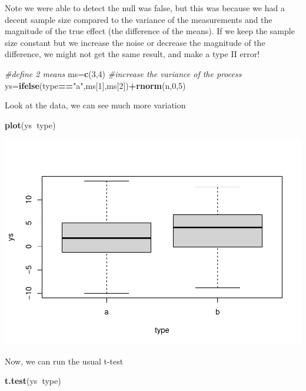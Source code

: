 \documentclass[
]{book}
\newenvironment{Shaded}{\begin{snugshade}}{\end{snugshade}}
\newcommand{\CommentTok}[1]{\textcolor[rgb]{0.56,0.35,0.01}{\textit{#1}}}
\newcommand{\DecValTok}[1]{\textcolor[rgb]{0.00,0.00,0.81}{#1}}
\newcommand{\KeywordTok}[1]{\textcolor[rgb]{0.13,0.29,0.53}{\textbf{#1}}}
\newcommand{\NormalTok}[1]{#1}
\newcommand{\OperatorTok}[1]{\textcolor[rgb]{0.81,0.36,0.00}{\textbf{#1}}}
\newcommand{\StringTok}[1]{\textcolor[rgb]{0.31,0.60,0.02}{#1}}
\begin{document}
Note we were able to detect the null was false, but this was because we had a decent sample size compared to the variance of the measurements and the magnitude of the true effect (the difference of the means). If we keep the sample size constant but we increase the noise or decrease the magnitude of the difference, we might not get the same result, and make a type II error!

\begin{Shaded}
\begin{Highlighting}[]
\CommentTok{#define 2 means}
\NormalTok{ms=}\KeywordTok{c}\NormalTok{(}\DecValTok{3}\NormalTok{,}\DecValTok{4}\NormalTok{)}
\CommentTok{#increase the variance of the process}
\NormalTok{ys=}\KeywordTok{ifelse}\NormalTok{(type}\OperatorTok{==}\StringTok{"a"}\NormalTok{,ms[}\DecValTok{1}\NormalTok{],ms[}\DecValTok{2}\NormalTok{])}\OperatorTok{+}\KeywordTok{rnorm}\NormalTok{(n,}\DecValTok{0}\NormalTok{,}\DecValTok{5}\NormalTok{)}
\end{Highlighting}
\end{Shaded}

Look at the data, we can see much more variation

\begin{Shaded}
\begin{Highlighting}[]
\KeywordTok{plot}\NormalTok{(ys}\OperatorTok{~}\NormalTok{type)}
\end{Highlighting}
\end{Shaded}

\includegraphics{ECOMODbook_files/figure-latex/a8.12-1.pdf}

Now, we can run the usual t-test

\begin{Shaded}
\begin{Highlighting}[]
\KeywordTok{t.test}\NormalTok{(ys}\OperatorTok{~}\NormalTok{type)}
\end{Highlighting}
\end{Shaded}
\end{document}
